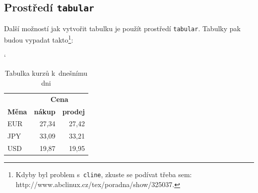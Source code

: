 \documentclass[a4paper, 11pt]{article}
\begin{document}
\subsection{Prostředí \texttt{tabular}}
Další možností jak vytvořit tabulku je použít prostředí \texttt{tabular}. Tabulky pak budou vypadat takto\footnote{Kdyby byl problem s~\texttt{cline}, zkuste se podívat třeba sem: http://www.abclinux.cz/tex/poradna/show/325037.}:
\bigskip
\begin{table}[h]
\begin{center}
\catcode`
\begin{tabular}{| l | r | r |} \hline
& \multicolumn{2}{|c|}{\textbf{Cena}} \\ \cline{2-3}
\textbf{Měna} & \textbf{nákup} & \textbf{prodej} \\ \hline
EUR & 27,34 & 27,42 \\
JPY & 33,09 & 33,21 \\
USD & 19,87 & 19,95 \\ \hline
\end{tabular}
\caption{Tabulka kurzů k~dnešnímu dni}
\label{tab:tab1}
\end{center}
\end{table}
\end{document}
